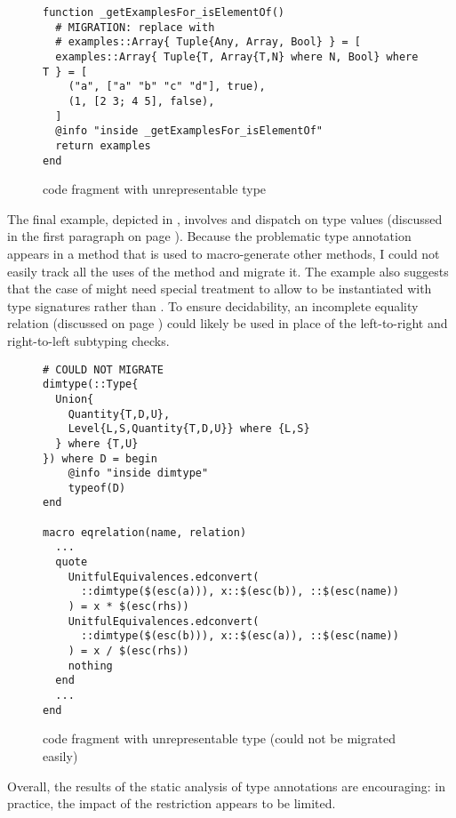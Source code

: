\begin{figure}
\begin{minipage}{12cm}
\begin{lstlisting}
function _getExamplesFor_isElementOf()
  # MIGRATION: replace with
  # examples::Array{ Tuple{Any, Array, Bool} } = [
  examples::Array{ Tuple{T, Array{T,N} where N, Bool} where T } = [
    ("a", ["a" "b" "c" "d"], true),
    (1, [2 3; 4 5], false),
  ]
  @info "inside _getExamplesFor_isElementOf"
  return examples
end
\end{lstlisting}
\end{minipage}
\caption{ code fragment with unrepresentable type
}\label{fig:evaluation-migrate-alicorn}
\end{figure}

The final example, depicted in , 
involves  and dispatch on type values (discussed in the first
paragraph on page \pageref{fig:code:dispatch-on-type}).
Because the problematic type annotation appears in a method that is used
to macro-generate other methods, I could not easily
track all the uses of the method and migrate it.
The example also suggests that the case of  might need
special treatment to allow  to be instantiated with type signatures
\tysig rather than \ty. To ensure decidability, an incomplete equality
relation (discussed on page \pageref{item:use-equality})
could likely be used in place of the left-to-right and right-to-left
subtyping checks.

\begin{figure}
\begin{minipage}{12cm}
\begin{lstlisting}
# COULD NOT MIGRATE
dimtype(::Type{
  Union{
    Quantity{T,D,U}, 
    Level{L,S,Quantity{T,D,U}} where {L,S}
  } where {T,U}
}) where D = begin
	@info "inside dimtype"
	typeof(D)
end

macro eqrelation(name, relation)
  ...
  quote
    UnitfulEquivalences.edconvert(
      ::dimtype($(esc(a))), x::$(esc(b)), ::$(esc(name))
    ) = x * $(esc(rhs))
    UnitfulEquivalences.edconvert(
      ::dimtype($(esc(b))), x::$(esc(a)), ::$(esc(name))
    ) = x / $(esc(rhs))
    nothing
  end
  ...
end

\end{lstlisting}
\end{minipage}
\caption{ code fragment with unrepresentable type
(could not be migrated easily)
}\label{fig:evaluation-migrate-unitful}
\end{figure}

Overall, the results of the static analysis of type annotations
are encouraging: in practice, the impact of the restriction appears to be
limited.
